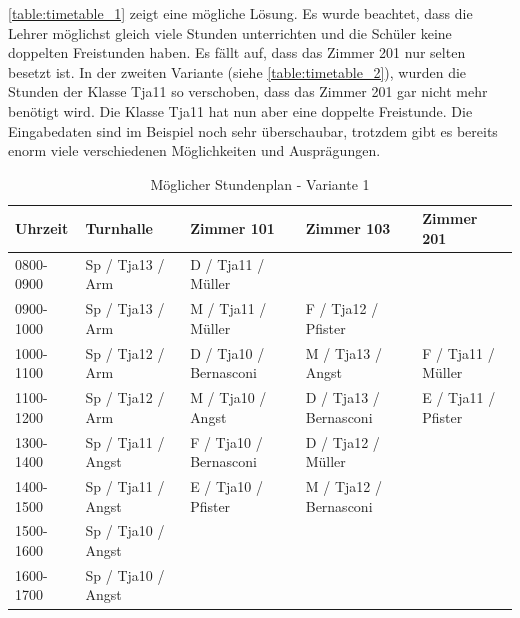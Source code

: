 \FloatBarrier
\autoref{table:timetable_1} zeigt eine mögliche Lösung. Es wurde beachtet, dass die Lehrer möglichst gleich viele Stunden unterrichten und die Schüler keine doppelten Freistunden haben. Es 
fällt auf, dass das Zimmer 201 nur selten besetzt ist. In der zweiten Variante (siehe \autoref{table:timetable_2}), wurden die Stunden der Klasse Tja11 so verschoben, dass 
das Zimmer 201 gar nicht mehr benötigt wird. Die Klasse Tja11 hat nun aber eine doppelte Freistunde. Die Eingabedaten sind im Beispiel noch sehr überschaubar, 
trotzdem gibt es bereits enorm viele verschiedenen Möglichkeiten und Ausprägungen.

\begin{table}[ht]
\centering
  \begin{tabular}{ l | l | l | l | l }
	\hline
	\rowcolor{gray}
	\textbf{Uhrzeit} 	& \textbf{Turnhalle}	& \textbf{Zimmer 101} 	& \textbf{Zimmer 103}	&  \textbf{Zimmer 201}\\ \hline
	0800-0900		& Sp / Tja13 / Arm		& D / Tja11 / Müller		& 				& \\ \hline
	0900-1000		& Sp / Tja13 / Arm		& M / Tja11 / Müller		& F / Tja12 / Pfister		& \\ \hline
	1000-1100		& Sp / Tja12 / Arm		& D / Tja10 / Bernasconi	& M / Tja13 / Angst		& F / Tja11 / Müller\\ \hline
	1100-1200		& Sp / Tja12 / Arm		& M / Tja10 / Angst		& D / Tja13 / Bernasconi	& E / Tja11 / Pfister\\ \hline \hline
	1300-1400		& Sp / Tja11 / Angst	& F / Tja10 / Bernasconi	& D / Tja12 / Müller		& \\ \hline
	1400-1500		& Sp / Tja11 / Angst	& E / Tja10 / Pfister		& M / Tja12 / Bernasconi	& \\ \hline
	1500-1600		& Sp / Tja10 / Angst	& 				& 				& \\ \hline
	1600-1700		& Sp / Tja10 / Angst	& 				& 				& \\ \hline
  \end{tabular}
   \caption{Möglicher Stundenplan - Variante 1}\label{table:timetable_1}
\end{table}

